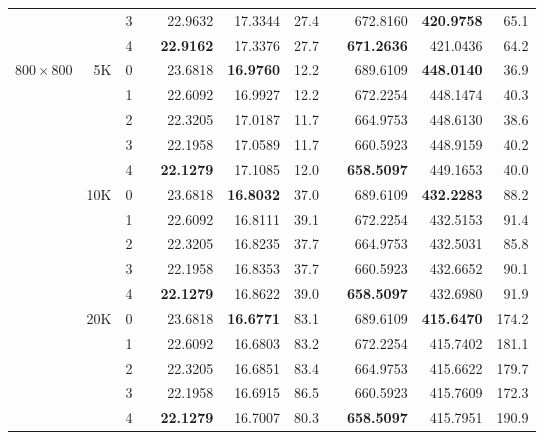 \begin{table}[p!]
{\begin{tabular*}{\hsize}{crrlrrrlrrr}
                &     & 3 &   &      22.9632  &      17.3344  & 27.4 &  &      672.8160  & {\bf 420.9758} &  65.1 \\
                &     & 4 &   & {\bf 22.9162} &      17.3376  & 27.7 &  & {\bf 671.2636} &      421.0436  &  64.2 \\
\hline
$800\times 800$ &  5K & 0 &   &      23.6818  & {\bf 16.9760} & 12.2 &  &      689.6109  & {\bf 448.0140} &  36.9 \\
                &     & 1 &   &      22.6092  &      16.9927  & 12.2 &  &      672.2254  &      448.1474  &  40.3 \\
                &     & 2 &   &      22.3205  &      17.0187  & 11.7 &  &      664.9753  &      448.6130  &  38.6 \\
                &     & 3 &   &      22.1958  &      17.0589  & 11.7 &  &      660.5923  &      448.9159  &  40.2 \\
                &     & 4 &   & {\bf 22.1279} &      17.1085  & 12.0 &  & {\bf 658.5097} &      449.1653  &  40.0 \\
\cline{2-11}
                & 10K & 0 &   &      23.6818  & {\bf 16.8032} & 37.0 &  &      689.6109  & {\bf 432.2283} &  88.2 \\
                &     & 1 &   &      22.6092  &      16.8111  & 39.1 &  &      672.2254  &      432.5153  &  91.4 \\
                &     & 2 &   &      22.3205  &      16.8235  & 37.7 &  &      664.9753  &      432.5031  &  85.8 \\
                &     & 3 &   &      22.1958  &      16.8353  & 37.7 &  &      660.5923  &      432.6652  &  90.1 \\
                &     & 4 &   & {\bf 22.1279} &      16.8622  & 39.0 &  & {\bf 658.5097} &      432.6980  &  91.9 \\
\cline{2-11}
                & 20K & 0 &   &      23.6818  & {\bf 16.6771} & 83.1 &  &      689.6109  & {\bf 415.6470} & 174.2 \\
                &     & 1 &   &      22.6092  &      16.6803  & 83.2 &  &      672.2254  &      415.7402  & 181.1 \\
                &     & 2 &   &      22.3205  &      16.6851  & 83.4 &  &      664.9753  &      415.6622  & 179.7 \\
                &     & 3 &   &      22.1958  &      16.6915  & 86.5 &  &      660.5923  &      415.7609  & 172.3 \\
                &     & 4 &   & {\bf 22.1279} &      16.7007  & 80.3 &  & {\bf 658.5097} &      415.7951  & 190.9 \\
\hline
\end{tabular*}}
\end{table}

